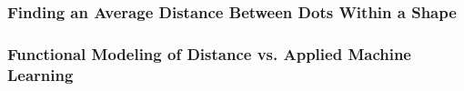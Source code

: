 \subsubsection{Finding an Average Distance Between Dots Within a Shape}
\subsubsection{Functional Modeling of Distance vs. Applied Machine Learning}
